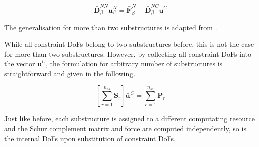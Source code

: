 \documentclass[../DomainDecomposition.tex]{subfiles}
\begin{document}
\begin{equation}
    \bar{\mathbf{D}}_{\beta}^{NN} 
    \bar{\mathbf{u}}_{\beta}^{N} 
    =
    \bar{\mathbf{F}}_{\beta}^{N} - 
    \bar{\mathbf{D}}_{\beta}^{NC} 
    \bar{\mathbf{u}}^{C} 
\end{equation}

\vspace{12pt} 
The generalisation for more than two substructures is adapted from \cite{chatterjee2020uncertainty}. 
\vspace{12pt} 

While all constraint DoFs belong to two substructures before, this is not the case for more than two substructures. 
However, by collecting all constraint DoFs into the vector $\bar{\mathbf{u}}^{C}$, the formulation for arbitrary number of substructures is straightforward and given in the following. 

\begin{equation}
    \left[
        \sum_{r=1}^{n_{ss}}{
            \mathbf{S}_{r} 
        }
    \right]
    \bar{\mathbf{u}}^{C} 
    = 
    \sum_{r=1}^{n_{ss}}{
        \mathbf{P}_{r} 
    }
\end{equation}

Just like before, each substructure is assigned to a different computating resource and the Schur complement matrix and force are computed independently, so is the internal DoFs upon substitution of constraint DoFs. 
\end{document}
